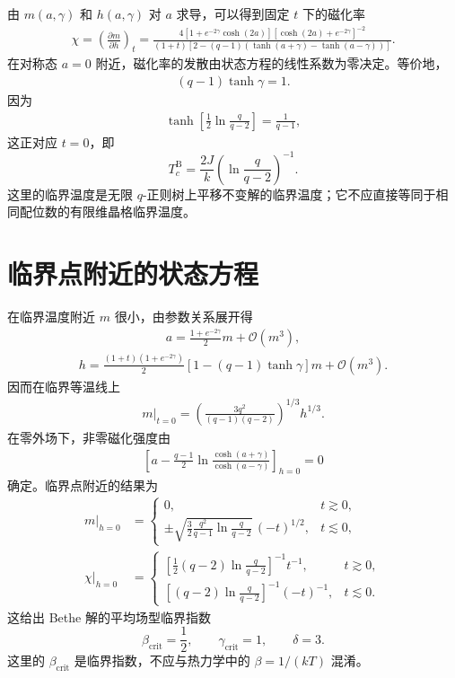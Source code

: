 由 \(m(a,\gamma)\) 和 \(h(a,\gamma)\) 对 \(a\) 求导，可以得到固定 \(t\) 下的磁化率
\begin{align*}
	\chi=\left(\frac{\partial m}{\partial h}\right)_t
	=\frac{
	4\left[1+e^{-2\gamma}\cosh(2a)\right]
	\left[\cosh(2a)+e^{-2\gamma}\right]^{-2}}
	{(1+t)\left[
	2-(q-1)\left(\tanh(a+\gamma)-\tanh(a-\gamma)\right)
	\right]} .
\end{align*}
在对称态 \(a=0\) 附近，磁化率的发散由状态方程的线性系数为零决定。等价地，
\begin{align*}
	(q-1)\tanh\gamma=1.
\end{align*}
因为
\begin{align*}
	\tanh\left[\frac12\ln\frac q{q-2}\right]=\frac1{q-1},
\end{align*}
这正对应 \(t=0\)，即
\[
	T_c^{\mathrm B}
	=\frac{2J}{k}\left(\ln\frac q{q-2}\right)^{-1}.
\]
这里的临界温度是无限 \(q\)-正则树上平移不变解的临界温度；它不应直接等同于相同配位数的有限维晶格临界温度。

\section{临界点附近的状态方程}

在临界温度附近 \(m\) 很小，由参数关系展开得
\begin{align*}
	a=\frac{1+e^{-2\gamma}}2m+\mathcal O(m^3),
\end{align*}
\begin{align*}
	h=\frac{(1+t)(1+e^{-2\gamma})}{2}
	\left[1-(q-1)\tanh\gamma\right]m
	+\mathcal O(m^3).
\end{align*}
因而在临界等温线上
\begin{align*}
	\left.m\right|_{t=0}
	=\left(\frac{3q^2}{(q-1)(q-2)}\right)^{1/3}h^{1/3}.
\end{align*}
在零外场下，非零磁化强度由
\begin{align*}
	\left[
	a-\frac{q-1}{2}
	\ln\frac{\cosh(a+\gamma)}{\cosh(a-\gamma)}
	\right]_{h=0}=0
\end{align*}
确定。临界点附近的结果为
\begin{align*}
\left.m\right|_{h=0}
&=
\begin{cases}
	0,&t\gtrsim0,\\
\displaystyle
\pm\sqrt{\frac32\frac{q^2}{q-1}
\ln\frac q{q-2}}\,(-t)^{1/2},&t\lesssim0,
\end{cases}\\
\left.\chi\right|_{h=0}
&=
\begin{cases}
\displaystyle
\left[\frac12(q-2)\ln\frac q{q-2}\right]^{-1}t^{-1},
	&t\gtrsim0,\\
\displaystyle
\left[(q-2)\ln\frac q{q-2}\right]^{-1}(-t)^{-1},
	&t\lesssim0.
\end{cases}
\end{align*}
这给出 Bethe 解的平均场型临界指数
\[
\beta_{\mathrm{crit}}=\frac12,\qquad
\gamma_{\mathrm{crit}}=1,\qquad
\delta=3.
\]
这里的 \(\beta_{\mathrm{crit}}\) 是临界指数，不应与热力学中的 \(\beta=1/(kT)\) 混淆。

